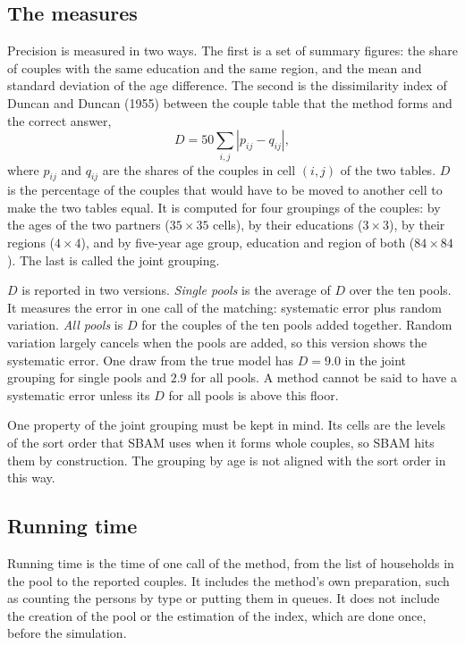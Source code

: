 \documentclass[12pt,a4paper]{article}
\begin{document}
\subsection{The measures}

Precision is measured in two ways. The first is a set of summary figures: the share of couples
with the same education and the same region, and the mean and standard deviation of the age
difference. The second is the dissimilarity index of Duncan and Duncan (1955) between the couple
table that the method forms and the correct answer,
\begin{equation}
D = 50 \sum_{i,j} \left| p_{ij} - q_{ij} \right| ,
\end{equation}
where $p_{ij}$ and $q_{ij}$ are the shares of the couples in cell $(i,j)$ of the two tables. $D$
is the percentage of the couples that would have to be moved to another cell to make the two
tables equal. It is computed for four groupings of the couples: by the ages of the two partners
($35 \times 35$ cells), by their educations ($3 \times 3$), by their regions ($4 \times 4$), and
by five-year age group, education and region of both ($84 \times 84$). The last is called the
joint grouping.

$D$ is reported in two versions. \emph{Single pools} is the average of $D$ over the ten pools. It
measures the error in one call of the matching: systematic error plus random variation.
\emph{All pools} is $D$ for the couples of the ten pools added together. Random variation largely
cancels when the pools are added, so this version shows the systematic error. One draw from the
true model has $D = 9.0$ in the joint grouping for single pools and $2.9$ for all pools. A
method cannot be said to have a systematic error unless its $D$ for all pools is above this floor.

One property of the joint grouping must be kept in mind. Its cells are the levels of the sort
order that SBAM uses when it forms whole couples, so SBAM hits them by construction. The
grouping by age is not aligned with the sort order in this way.

\subsection{Running time}

Running time is the time of one call of the method, from the list of households in the pool to
the reported couples. It includes the method's own preparation, such as counting the persons by
type or putting them in queues. It does not include the creation of the pool or the estimation of
the index, which are done once, before the simulation.
\end{document}
